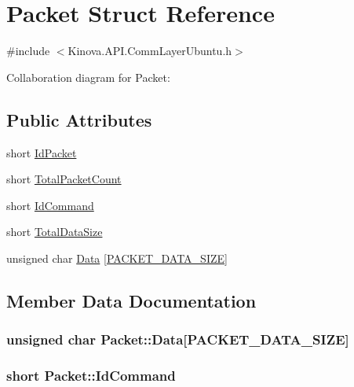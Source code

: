\hypertarget{struct_packet}{}\section{Packet Struct Reference}
\label{struct_packet}


{\ttfamily \#include $<$Kinova.\+A\+P\+I.\+Comm\+Layer\+Ubuntu.\+h$>$}



Collaboration diagram for Packet\+:
\subsection*{Public Attributes}
\begin{DoxyCompactItemize}
\item 
short \hyperlink{struct_packet_af74e2cb3038d19a97729f6e6bf1e8e93}{Id\+Packet}
\item 
short \hyperlink{struct_packet_a146c0888f5e5e591735df01d1b627ae6}{Total\+Packet\+Count}
\item 
short \hyperlink{struct_packet_a16775da153c1fcceb514766c0054ad0b}{Id\+Command}
\item 
short \hyperlink{struct_packet_a1f7f00740719cb05e71795512c70657b}{Total\+Data\+Size}
\item 
unsigned char \hyperlink{struct_packet_a51fd5c26ef2995c2e93b49a5a7100397}{Data} \mbox{[}\hyperlink{_kinova_8_a_p_i_8_comm_layer_ubuntu_8h_a515f46a87f301d94d9f3b06a6bb2540a}{P\+A\+C\+K\+E\+T\+\_\+\+D\+A\+T\+A\+\_\+\+S\+I\+ZE}\mbox{]}
\end{DoxyCompactItemize}


\subsection{Member Data Documentation}
\subsubsection[{\texorpdfstring{Data}{Data}}]{\setlength{\rightskip}{0pt plus 5cm}unsigned char Packet\+::\+Data\mbox{[}{\bf P\+A\+C\+K\+E\+T\+\_\+\+D\+A\+T\+A\+\_\+\+S\+I\+ZE}\mbox{]}}\hypertarget{struct_packet_a51fd5c26ef2995c2e93b49a5a7100397}{}\label{struct_packet_a51fd5c26ef2995c2e93b49a5a7100397}
\subsubsection[{\texorpdfstring{Id\+Command}{IdCommand}}]{\setlength{\rightskip}{0pt plus 5cm}short Packet\+::\+Id\+Command}\hypertarget{struct_packet_a16775da153c1fcceb514766c0054ad0b}{}\label{struct_packet_a16775da153c1fcceb514766c0054ad0b}
